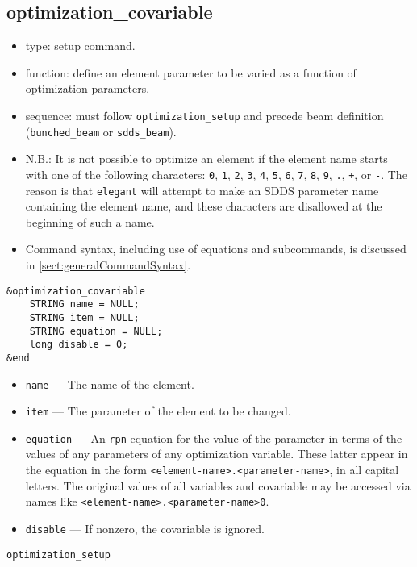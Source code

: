 \documentclass[11pt]{article}
\begin{document}
\subsection{optimization\_covariable \label{subsec:optimizationcovariable}}

\begin{itemize}
\item type: setup command.
\item function: define an element parameter to be varied as a function of optimization parameters.
\item sequence: must follow \verb|optimization_setup| and precede beam definition (\verb|bunched_beam| or \verb|sdds_beam|).
\item N.B.: It is not possible to optimize an element if the element name starts with one of the following
characters: 
\verb|0|, \verb|1|, \verb|2|, \verb|3|, \verb|4|, \verb|5|, \verb|6|, \verb|7|, \verb|8|,
\verb|9|, \verb|.|, \verb|+|, or \verb|-|.  The reason is that {\tt elegant} will attempt to 
make an SDDS parameter name containing the element name, and these characters are disallowed
at the beginning of such a name.
\item Command syntax, including use of equations and subcommands, is discussed in \ref{sect:generalCommandSyntax}.
\end{itemize}

\begin{verbatim}
&optimization_covariable
    STRING name = NULL;
    STRING item = NULL;
    STRING equation = NULL;
    long disable = 0;
&end
\end{verbatim}

\begin{itemize}
\item \verb|name| --- The name of the element.
\item \verb|item| --- The parameter of the element to be changed.
\item \verb|equation| --- An {\tt rpn} equation for the value of the parameter in terms of the
values of any parameters of any optimization variable.  These latter appear in the equation in the
form \verb|<element-name>.<parameter-name>|, in all capital letters.  The original values of all
variables and covariable may be accessed via names like \verb|<element-name>.<parameter-name>0|.
\item \verb|disable| --- If nonzero, the covariable is ignored.
\end{itemize}

\newpage
\begin{center}{\Large\verb|optimization_setup|}\end{center}
\end{document}
